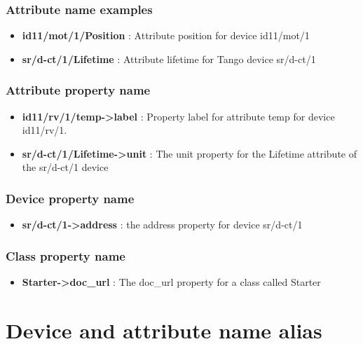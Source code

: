 \subsubsection{Attribute name examples}
\begin{itemize}
\item \textbf{id11/mot/1/Position} : Attribute position for device id11/mot/1 
\item \textbf{sr/d-ct/1/Lifetime} : Attribute lifetime for Tango device
sr/d-ct/1
\end{itemize}

\subsubsection{Attribute property name}
\begin{itemize}
\item \textbf{id11/rv/1/temp->label} : Property label for attribute temp
for device id11/rv/1.
\item \textbf{sr/d-ct/1/Lifetime->unit} : The unit property for the Lifetime
attribute of the sr/d-ct/1 device
\end{itemize}

\subsubsection{Device property name}
\begin{itemize}
\item \textbf{sr/d-ct/1->address} : the address property for device sr/d-ct/1
\end{itemize}

\subsubsection{Class property name}
\begin{itemize}
\item \textbf{Starter->doc\_url} : The doc\_url property for a class called
Starter
\end{itemize}

\section{Device and attribute name alias}

